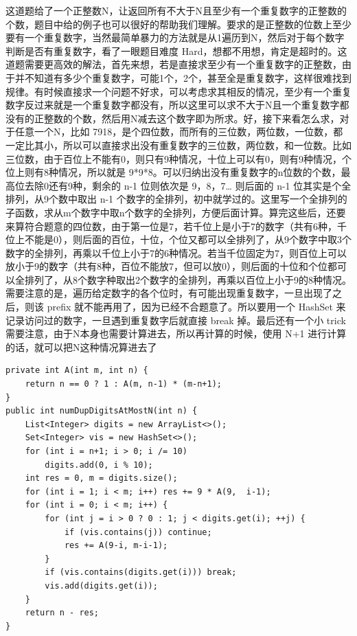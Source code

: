 \documentclass[9pt, b5paaper]{book}
\begin{document}
\begin{enumerate}
这道题给了一个正整数N，让返回所有不大于N且至少有一个重复数字的正整数的个数，题目中给的例子也可以很好的帮助我们理解。要求的是正整数的位数上至少要有一个重复数字，当然最简单暴力的方法就是从1遍历到N，然后对于每个数字判断是否有重复数字，看了一眼题目难度 Hard，想都不用想，肯定是超时的。这道题需要更高效的解法，首先来想，若是直接求至少有一个重复数字的正整数，由于并不知道有多少个重复数字，可能1个，2个，甚至全是重复数字，这样很难找到规律。有时候直接求一个问题不好求，可以考虑求其相反的情况，至少有一个重复数字反过来就是一个重复数字都没有，所以这里可以求不大于N且一个重复数字都没有的正整数的个数，然后用N减去这个数字即为所求。好，接下来看怎么求，对于任意一个N，比如 7918，是个四位数，而所有的三位数，两位数，一位数，都一定比其小，所以可以直接求出没有重复数字的三位数，两位数，和一位数。比如三位数，由于百位上不能有0，则只有9种情况，十位上可以有0，则有9种情况，个位上则有8种情况，所以就是 9*9*8。可以归纳出没有重复数字的n位数的个数，最高位去除0还有9种，剩余的 n-1 位则依次是 9，8，7\ldots{} 则后面的 n-1 位其实是个全排列，从9个数中取出 n-1 个数字的全排列，初中就学过的。这里写一个全排列的子函数，求从m个数字中取n个数字的全排列，方便后面计算。算完这些后，还要来算符合题意的四位数，由于第一位是7，若千位上是小于7的数字（共有6种，千位上不能是0），则后面的百位，十位，个位又都可以全排列了，从9个数字中取3个数字的全排列，再乘以千位上小于7的6种情况。若当千位固定为7，则百位上可以放小于9的数字（共有8种，百位不能放7，但可以放0），则后面的十位和个位都可以全排列了，从8个数字种取出2个数字的全排列，再乘以百位上小于9的8种情况。需要注意的是，遍历给定数字的各个位时，有可能出现重复数字，一旦出现了之后，则该 prefix 就不能再用了，因为已经不合题意了。所以要用一个 HashSet 来记录访问过的数字，一旦遇到重复数字后就直接 break 掉。最后还有一个小 trick 需要注意，由于N本身也需要计算进去，所以再计算的时候，使用 N+1 进行计算的话，就可以把N这种情况算进去了
\begin{verbatim}
private int A(int m, int n) {
    return n == 0 ? 1 : A(m, n-1) * (m-n+1);
}
public int numDupDigitsAtMostN(int n) {
    List<Integer> digits = new ArrayList<>();
    Set<Integer> vis = new HashSet<>();
    for (int i = n+1; i > 0; i /= 10) 
        digits.add(0, i % 10);
    int res = 0, m = digits.size();
    for (int i = 1; i < m; i++) res += 9 * A(9,  i-1);
    for (int i = 0; i < m; i++) {
        for (int j = i > 0 ? 0 : 1; j < digits.get(i); ++j) {
            if (vis.contains(j)) continue;
            res += A(9-i, m-i-1);
        }
        if (vis.contains(digits.get(i))) break;
        vis.add(digits.get(i));
    }
    return n - res;
}
\end{verbatim}
\end{enumerate}
\end{document}
